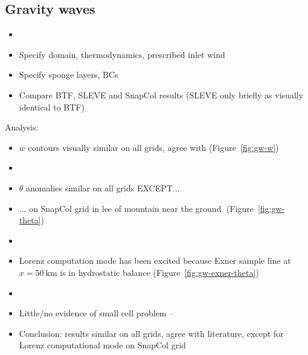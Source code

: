 \documentclass{ametsoc}
\begin{document}
\subsection{Gravity waves}
\begin{itemize}
	\item {}
	\item Specify domain, thermodynamics, prescribed inlet wind
	\item Specify sponge layers, BCs
	\item Compare BTF, SLEVE and SnapCol results (SLEVE only briefly as visually identical to BTF)
\end{itemize}

Analysis:
\begin{itemize}
	\item $w$ contours visually similar on all grids, agree with \textcite{melvin2010} (Figure~\ref{fig:gw-w})
	\item {}
	\item $\theta$ anomalies similar on all grids EXCEPT...
	\item ... on SnapCol grid in lee of mountain near the ground. (Figure~\ref{fig:gw-theta})
	\item {}
	\item Lorenz computation mode has been excited because Exner sample line at $x = \SI{50}{\kilo\meter}$ is in hydrostatic balance (Figure~\ref{fig:gw-exner-theta})
	\item {}
	\item Little/no evidence of small cell problem -- 
	\item Conclusion: results similar on all grids, agree with literature, except for Lorenz computational mode on SnapCol grid
\end{itemize}
\end{document}

